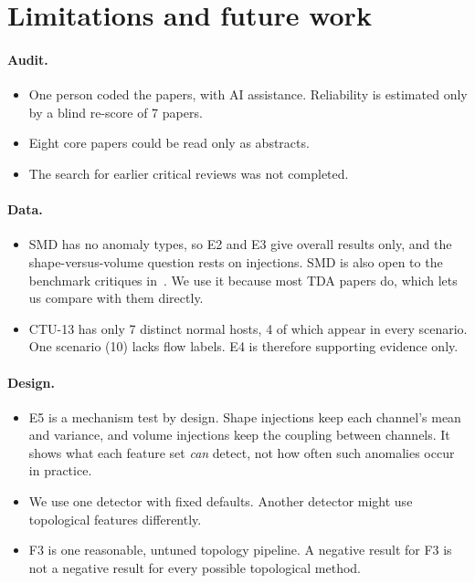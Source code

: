 \section{Limitations and future work}
\label{sec:limits}


\paragraph{Audit.}
\begin{itemize}
  \item One person coded the papers, with AI assistance. Reliability is estimated only by a blind re-score of 7 papers.
  \item Eight core papers could be read only as abstracts.
  \item The search for earlier critical reviews was not completed.
\end{itemize}

\paragraph{Data.}
\begin{itemize}
  \item SMD has no anomaly types, so E2 and E3 give overall results only, and the shape-versus-volume question rests on injections. SMD is also open to the benchmark critiques in~\cite{Q04}. We use it because most TDA papers do, which lets us compare with them directly.
  \item CTU-13 has only 7 distinct normal hosts, 4 of which appear in every scenario. One scenario (10) lacks flow labels. E4 is therefore supporting evidence only.
\end{itemize}

\paragraph{Design.}
\begin{itemize}
  \item E5 is a mechanism test by design. Shape injections keep each channel's mean and variance, and volume injections keep the coupling between channels. It shows what each feature set \emph{can} detect, not how often such anomalies occur in practice.
  \item We use one detector with fixed defaults. Another detector might use topological features differently.
  \item F3 is one reasonable, untuned topology pipeline. A negative result for F3 is not a negative result for every possible topological method.
\end{itemize}


